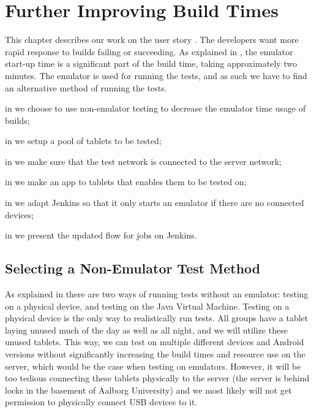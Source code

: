 \chapter{Further Improving Build Times}
This chapter describes our work on the user story . The developers want more rapid response to builds failing or succeeding. As explained in , the emulator start-up time is a significant part of the build time, taking approximately two minutes. The emulator is used for running the tests, and as such we have to find an alternative method of running the tests.

\begin{chapterorganization}
  \item in  we choose to use non-emulator testing to decrease the emulator time usage of builds;
  \item in  we setup a pool of tablets to be tested;
  \item in  we make sure that the test network is connected to the server network;
  \item in  we make an app to tablets that enables them to be tested on;
  \item in  we adapt Jenkins so that it only starts an emulator if there are no connected devices;
  \item in  we present the updated flow for jobs on Jenkins.
\end{chapterorganization}

\section{Selecting a Non-Emulator Test Method}\label{sec:selecting_nonemu_method}
As explained in  there are two ways of running tests without an emulator: testing on a physical device, and testing on the Java Virtual Machine. Testing on a physical device is the only way to realistically run tests. All groups have a tablet laying unused much of the day as well as all night, and we will utilize these unused tablets. This way, we can test on multiple different devices and Android versions without significantly increasing the build times and resource use on the server, which would be the case when testing on emulators. However, it will be too tedious connecting these tablets physically to the server (the server is behind locks in the basement of Aalborg University) and we most likely will not get permission to physically connect USB devices to it.

